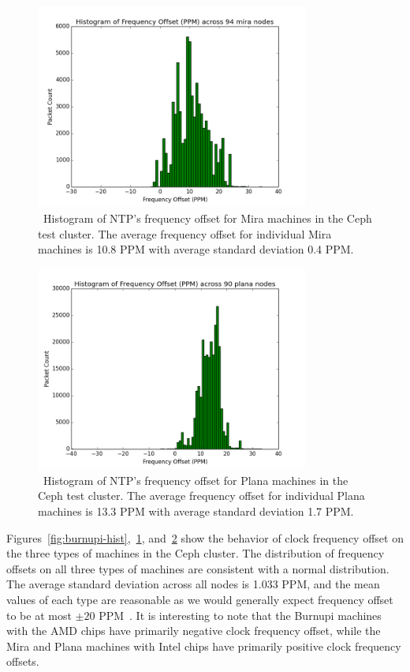 \begin{figure}[!htbp]
  \centering
  \caption{~Histogram of NTP's frequency offset for Mira machines in the Ceph test cluster.
  The average frequency offset for individual Mira machines is 10.8 PPM with average
  standard deviation 0.4 PPM.}
  \label{fig:mira-hist}
  \includegraphics[width=0.8\textwidth]{mira-freq-offset.png}
\end{figure}

\begin{figure}[!htbp]
  \centering
  \caption{~Histogram of NTP's frequency offset for Plana machines in the Ceph test cluster.
  The average frequency offset for individual Plana machines is 13.3 PPM with average
  standard deviation 1.7 PPM.}
  \label{fig:plana-hist}
  \includegraphics[width=0.8\textwidth]{plana-freq-offset.png}
\end{figure}


Figures~\ref{fig:burnupi-hist},~\ref{fig:mira-hist},
and~\ref{fig:plana-hist} show the behavior of clock frequency offset
on the three types of machines in the Ceph cluster. The distribution of frequency
offsets on all three types of machines are consistent with a 
normal distribution. The average standard deviation across all
nodes is 1.033 PPM, and the mean values of each type are reasonable as we would 
generally expect frequency offset to be at most $\pm 20$ PPM~\citep{gregscott}. 
It is interesting to note that the Burnupi
machines with the AMD chips have primarily negative clock frequency
offset, while the Mira and Plana machines with Intel chips have
primarily positive clock frequency offsets.



